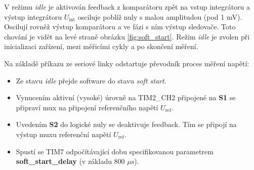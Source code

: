 \documentclass[twoside]{article}
\begin{document}
V režimu \textit{idle} je aktivován feedback z komparátoru zpět na vstup integrátoru a výstup integrátoru $U_{\text{int}}$ osciluje poblíž nuly s malou amplitudou (pod 1 mV).
Oscilují rovněž výstup komparátoru a ve fázi s ním výstup sledovače. Toto chování je vidět na levé straně obrázku \ref{fig:soft_start}.
Režim \textit{idle} je zvolen při inicializaci zařízení, mezi měřicími cykly a po skončení měření.

Na základě příkazu ze seriové linky odstartuje převodník proces měření napětí:
\begin{itemize}
    \item Ze stavu \textit{idle} přejde software do stavu \textit{soft start}.
    \item Vynucením aktivní (vysoké) úrovně na TIM2\_CH2 připojené na \textbf{S1} se připraví mux na připojení referenčního napětí $U_{\text{ref}}$.
    \item Uvedením \textbf{S2} do logické nuly se deaktivuje feedback. Tím se připojí na výstup muxu referenční napětí $U_{\text{ref}}$.
    \item Spustí se TIM7 odpočítávající dobu specifikovanou parametrem \textbf{soft\_start\_delay} (v základu 800 $\mu\text{s}$).
\end{itemize}
\end{document}
